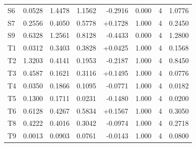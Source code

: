 \begin{table}[!htbp]
\begin{tabular}{lrrrrrrr}
S6 & 0.0528 & 1.4478 & 1.1562 & -0.2916 & 0.000 & 4 & 1.0776 \\
S7 & 0.2556 & 0.4050 & 0.5778 & +0.1728 & 1.000 & 4 & 0.2450 \\
S9 & 0.6328 & 1.2561 & 0.8128 & -0.4433 & 0.000 & 4 & 1.2800 \\
T1 & 0.0312 & 0.3403 & 0.3828 & +0.0425 & 1.000 & 4 & 0.1568 \\
T2 & 1.3203 & 0.4141 & 0.1953 & -0.2187 & 1.000 & 4 & 0.8450 \\
T3 & 0.4587 & 0.1621 & 0.3116 & +0.1495 & 1.000 & 4 & 0.0776 \\
T4 & 0.0350 & 0.1866 & 0.1095 & -0.0771 & 1.000 & 4 & 0.0182 \\
T5 & 0.1300 & 0.1711 & 0.0231 & -0.1480 & 1.000 & 4 & 0.0200 \\
T6 & 0.6128 & 0.4267 & 0.5834 & +0.1567 & 1.000 & 4 & 0.3050 \\
T8 & 0.4222 & 0.4016 & 0.3042 & -0.0974 & 1.000 & 4 & 0.2718 \\
T9 & 0.0013 & 0.0903 & 0.0761 & -0.0143 & 1.000 & 4 & 0.0800 \\
\bottomrule
\end{tabular}
\end{table}


